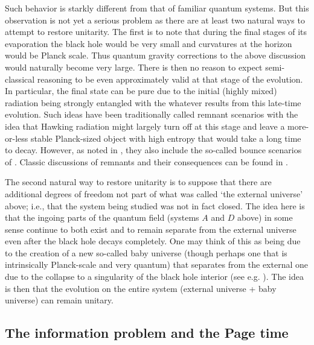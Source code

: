 \documentclass[12pt]{article}
\begin{document}
Such behavior is starkly different from that of familiar quantum systems. But this observation is not yet a serious problem as there are at least two natural ways to attempt to restore unitarity.  The first is to note that during the final stages of its evaporation the black hole would be very small and curvatures at the horizon would be Planck scale.  Thus quantum gravity corrections to the above discussion would naturally become very large.  There is then no reason to expect semi-classical reasoning to be even approximately valid at that stage of the evolution.  In particular, the final state can be pure due to the initial (highly mixed) radiation being strongly entangled with the whatever results from this late-time evolution.  Such ideas have been traditionally called remnant scenarios \cite{Hawking:1982dj} with the idea that Hawking radiation might largely turn off at this stage and leave a more-or-less stable Planck-sized object with high entropy that would take a long time to decay.  However, as noted in \cite{Almheiri:2013wka}, they also include the so-called bounce scenarios of \cite{Ashtekar:2008jd,Ashtekar:2010hx,Ashtekar:2010qz}.  Classic discussions of remnants and their consequences can be found in \cite{Giddings:1993km,Giddings:1994qt}.

The second natural way to restore unitarity is to suppose that there are additional degrees of freedom not part of what was called `the external universe' above; i.e., that the system being studied was not in fact closed.  The idea here is that the ingoing parts of the quantum field (systems $A$ and $D$ above) in some sense continue to both exist and to remain separate from the external universe even after the black hole decays completely.  One may think of this as being due to the creation of a new so-called baby universe (though perhaps one that is intrinsically Planck-scale and very quantum) that separates from the external one due to the collapse to a singularity of the black hole interior (see e.g. \cite{Markov:1984ii}).  The idea is then that the evolution on the entire system (external universe + baby universe) can remain unitary.

\subsection{The information problem and the Page time}
\label{Page}
\end{document}
